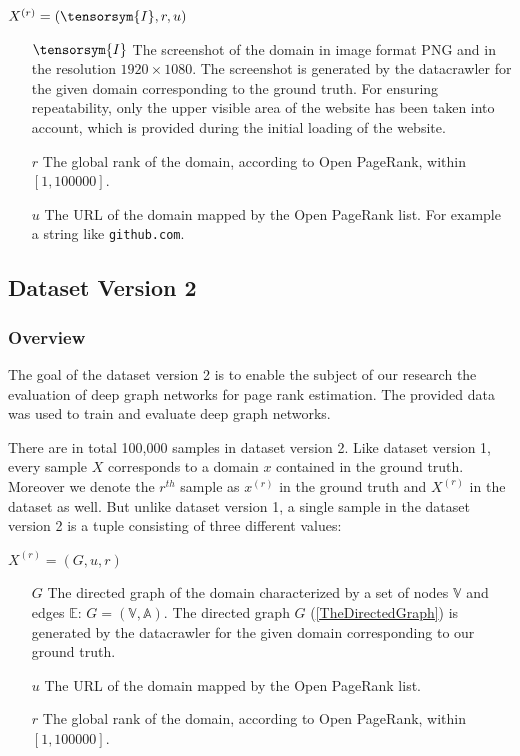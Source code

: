 \begin{center}
 $X^{(r)} = (\tensorsym{I}, r, u)$
\begin{itemize}
	\item[$\tensorsym{I}$] The screenshot of the domain in image format PNG and in the resolution $1920\times1080$. The screenshot is generated by the datacrawler for the given domain corresponding to the ground truth. For ensuring repeatability, only the upper visible area of the website has been taken into account, which is provided during the initial loading of the website. 
	\item[$r$] The global rank of the domain, according to Open PageRank, within $[1, 100000]$. 
	\item[$u$] The URL of the domain mapped by the Open PageRank list. For example a string like \texttt{github.com}.
\end{itemize}
\end{center}

\subsection{Dataset Version 2}
\label{DatasetVersion2}
\subsubsection{Overview}
The goal of the dataset version 2 is to enable the subject of our research the evaluation of deep graph networks for page rank estimation. The provided data was used to train and evaluate deep graph networks.

There are in total 100,000 samples in dataset version 2. Like dataset version 1, every sample $X$ corresponds to a domain $x$ contained in the ground truth. Moreover we denote the $r^{th}$ sample as $x^{(r)}$ in the ground truth and $X^{(r)}$ in the dataset as well. 
But unlike dataset version 1, a single sample in the dataset version 2 is a tuple consisting of three different values:

\begin{center}
$X^{(r)} = (G,u,r)$
\begin{itemize}
    \item[$G$] The directed graph of the domain characterized by a set of nodes $\mathbb{V}$ and edges $\mathbb{E}$: $G= \left(\mathbb{V}, \mathbb{A}\right)$. The directed graph $G$ (\ref{TheDirectedGraph}) is generated by the datacrawler for the given domain corresponding to our ground truth.
	\item[$u$] The URL of the domain mapped by the Open PageRank list.
	\item[$r$] The global rank of the domain, according to Open PageRank, within $[1, 100000]$. 
\end{itemize}
\end{center}

